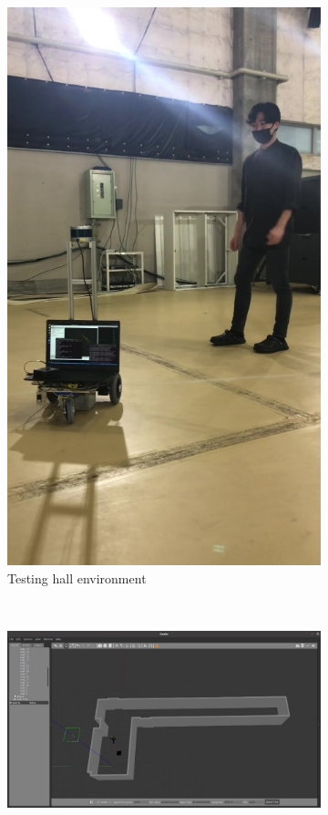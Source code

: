\begin{figure}[!htb]
\begin{subfigure}{.5\linewidth}
        \includegraphics{figures/chap4_fig/Platform/hall_environment.jpg}
        \caption{Testing hall environment}
        \label{chap4:fig4:sub2}
    \end{subfigure}\\[1ex]
    \begin{subfigure}{\linewidth}
        \centering
        \includegraphics{figures/chap4_fig/Platform/gazebo_environment.jpg}

\end{subfigure}
\end{figure}
